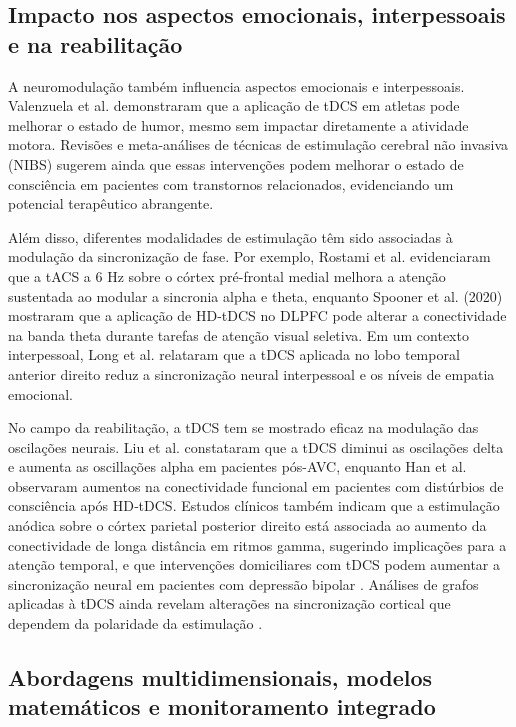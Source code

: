 \subsection{Impacto nos aspectos emocionais, interpessoais e na reabilitação}

A neuromodulação também influencia aspectos emocionais e interpessoais. Valenzuela et al. \cite{valenzuela2019enhancement} demonstraram que a aplicação de tDCS em atletas pode melhorar o estado de humor, mesmo sem impactar diretamente a atividade motora. Revisões e meta-análises de técnicas de estimulação cerebral não invasiva (NIBS) sugerem ainda que essas intervenções podem melhorar o estado de consciência em pacientes com transtornos relacionados, evidenciando um potencial terapêutico abrangente.

Além disso, diferentes modalidades de estimulação têm sido associadas à modulação da sincronização de fase. Por exemplo, Rostami et al. \cite{rostami2020transcranial} evidenciaram que a tACS a 6 Hz sobre o córtex pré-frontal medial melhora a atenção sustentada ao modular a sincronia alpha e theta, enquanto Spooner et al. (2020) \cite{spooner2020hdtdcs} mostraram que a aplicação de HD-tDCS no DLPFC pode alterar a conectividade na banda theta durante tarefas de atenção visual seletiva. Em um contexto interpessoal, Long et al. \cite{long2023transcranial} relataram que a tDCS aplicada no lobo temporal anterior direito reduz a sincronização neural interpessoal e os níveis de empatia emocional.

No campo da reabilitação, a tDCS tem se mostrado eficaz na modulação das oscilações neurais. Liu et al. \cite{liu2023effects} constataram que a tDCS diminui as oscilações delta e aumenta as oscillações alpha em pacientes pós-AVC, enquanto Han et al. \cite{han2022functional} observaram aumentos na conectividade funcional em pacientes com distúrbios de consciência após HD‑tDCS. Estudos clínicos também indicam que a estimulação anódica sobre o córtex parietal posterior direito está associada ao aumento da conectividade de longa distância em ritmos gamma, sugerindo implicações para a atenção temporal, e que intervenções domiciliares com tDCS podem aumentar a sincronização neural em pacientes com depressão bipolar \cite{xiao2025enhanced}. Análises de grafos aplicadas à tDCS ainda revelam alterações na sincronização cortical que dependem da polaridade da estimulação \cite{mancini2016assessing, pellegrino2019transcranial, schollmann2019anodal}.

\subsection{Abordagens multidimensionais, modelos matemáticos e monitoramento integrado}

